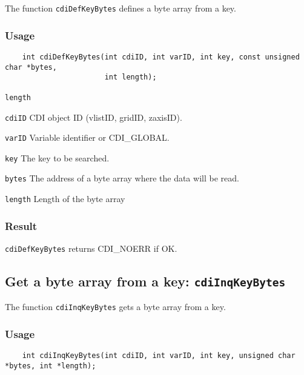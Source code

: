 The function {\texttt{cdiDefKeyBytes}} defines a byte array from a key.

\subsubsection*{Usage}

\begin{verbatim}
    int cdiDefKeyBytes(int cdiID, int varID, int key, const unsigned char *bytes, 
                       int length);
\end{verbatim}

\hspace*{4mm}\begin{minipage}[]{15cm}
\begin{deflist}{\texttt{length}\ }
\item[\texttt{cdiID}]
CDI object ID (vlistID, gridID, zaxisID).
\item[\texttt{varID}]
Variable identifier or CDI\_GLOBAL.
\item[\texttt{key}]
The key to be searched.
\item[\texttt{bytes}]
The address of a byte array where the data will be read.
\item[\texttt{length}]
Length of the byte array

\end{deflist}
\end{minipage}

\subsubsection*{Result}

{\texttt{cdiDefKeyBytes}} returns CDI\_NOERR if OK.



\subsection{Get a byte array from a key: \texttt{cdiInqKeyBytes}}
\label{cdiInqKeyBytes}

The function {\texttt{cdiInqKeyBytes}} gets a byte array from a key.

\subsubsection*{Usage}

\begin{verbatim}
    int cdiInqKeyBytes(int cdiID, int varID, int key, unsigned char *bytes, int *length);
\end{verbatim}

